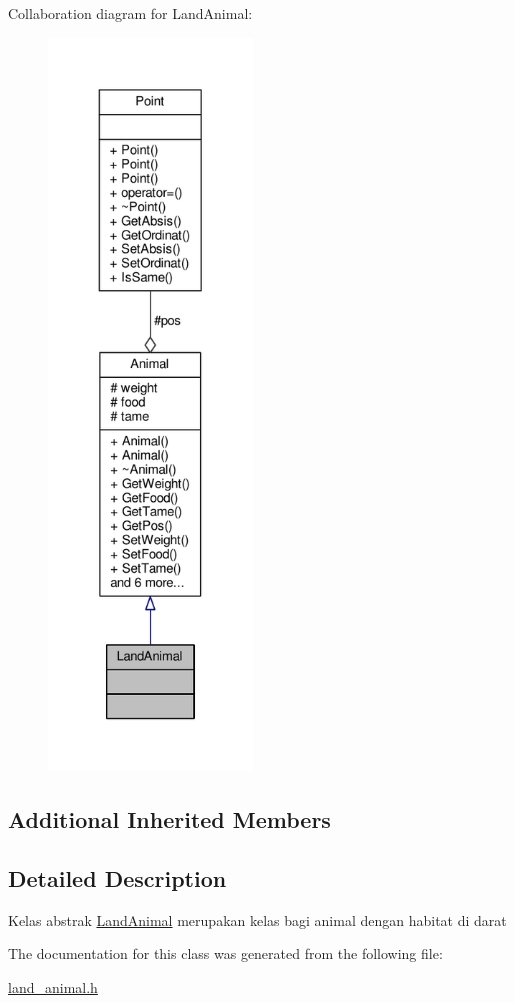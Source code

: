 Collaboration diagram for Land\+Animal\+:
\nopagebreak
\begin{figure}[H]
\begin{center}
\leavevmode
\includegraphics[height=550pt]{classLandAnimal__coll__graph}
\end{center}
\end{figure}
\subsection*{Additional Inherited Members}


\subsection{Detailed Description}
Kelas abstrak \hyperlink{classLandAnimal}{Land\+Animal} merupakan kelas bagi animal dengan habitat di darat 

The documentation for this class was generated from the following file\+:\begin{DoxyCompactItemize}
\item 
\hyperlink{land__animal_8h}{land\+\_\+animal.\+h}\end{DoxyCompactItemize}
